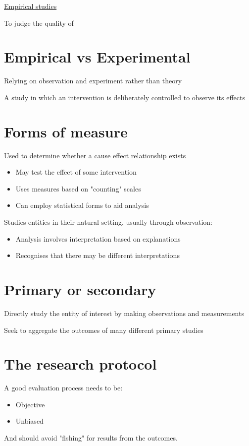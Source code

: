 \documentclass{article}[18pt]
\begin{document}
\begin{center}
\underline{\huge Empirical studies}
\end{center}
\begin{definition}[Evaluate]
	To judge the quality of
\end{definition}
\section{Empirical vs Experimental}
\begin{definition}[Empirical]
Relying on observation and experiment rather than theory
\end{definition}
\begin{definition}[Experiment]
A study in which an intervention is deliberately controlled to observe its effects
\end{definition}
\section{Forms of measure}
\begin{definition}
Used to determine whether a cause effect relationship exists
\begin{itemize}
	\item May test the effect of some intervention
	\item Uses measures based on "counting" scales
	\item Can employ statistical forms to aid analysis
\end{itemize}
\end{definition}
\begin{definition}
Studies entities in their natural setting, usually through observation:
\begin{itemize}
	\item Analysis involves interpretation based on explanations
	\item Recognises that there may be different interpretations
\end{itemize}
\end{definition}
\section{Primary or secondary}
\begin{definition}
Directly study the entity of interest by making observations and measurements
\end{definition}
\begin{definition}
Seek to aggregate the outcomes of many different primary studies
\end{definition}
\section{The research protocol}
A good evaluation process needs to be:
\begin{itemize}
	\item Objective
	\item Unbiased
\end{itemize}
And should avoid "fishing" for results from the outcomes.
\end{document}
